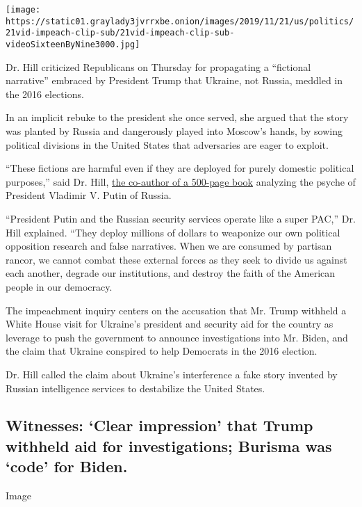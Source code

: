 \texttt{[image: https://static01.graylady3jvrrxbe.onion/images/2019/11/21/us/politics/21vid-impeach-clip-sub/21vid-impeach-clip-sub-videoSixteenByNine3000.jpg]}

Dr. Hill criticized Republicans on Thursday for propagating a
``fictional narrative'' embraced by President Trump that Ukraine, not
Russia, meddled in the 2016 elections.

In an implicit rebuke to the president she once served, she argued that
the story was planted by Russia and dangerously played into Moscow's
hands, by sowing political divisions in the United States that
adversaries are eager to exploit.

``These fictions are harmful even if they are deployed for purely
domestic political purposes,'' said Dr. Hill,
\href{https://www.nytimes3xbfgragh.onion/2019/11/21/us/politics/who-is-fiona-hill.html}{the
co-author of a 500-page book} analyzing the psyche of President Vladimir
V. Putin of Russia.

``President Putin and the Russian security services operate like a super
PAC,'' Dr. Hill explained. ``They deploy millions of dollars to
weaponize our own political opposition research and false narratives.
When we are consumed by partisan rancor, we cannot combat these external
forces as they seek to divide us against each another, degrade our
institutions, and destroy the faith of the American people in our
democracy.

The impeachment inquiry centers on the accusation that Mr. Trump
withheld a White House visit for Ukraine's president and security aid
for the country as leverage to push the government to announce
investigations into Mr. Biden, and the claim that Ukraine conspired to
help Democrats in the 2016 election.

Dr. Hill called the claim about Ukraine's interference a fake story
invented by Russian intelligence services to destabilize the United
States.

\hypertarget{witnesses-clear-impression-that-trump-withheld-aid-for-investigations-burisma-was-code-for-biden}{%
\subsection{Witnesses: `Clear impression' that Trump withheld aid for
investigations; Burisma was `code' for
Biden.}\label{witnesses-clear-impression-that-trump-withheld-aid-for-investigations-burisma-was-code-for-biden}}

Image

